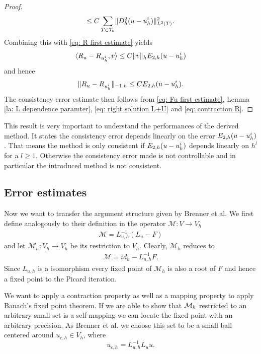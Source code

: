 \begin{proof}
\begin{align}
	\leq C \sum_{T \in \mathcal{T}_h} \lVert D_h^2 (u-u_h^i) \rVert_{L^2(T)}^2.
	\end{align}
	Combining this with \eqref{eq: R first estimate} yields
	\begin{align*}
	 \langle R_u - R_{u^i_h}, v \rangle \leq C \lVert v \rVert_{h} E_{2,h}(u-u_h^i)
	\end{align*}
	and hence 
	\begin{align}
	\lVert R_u - R_{u^i_h} \rVert_{-1,h} \leq C E_{2,h}(u-u_h^i). \label{eq: contraction R}
	\end{align}
	The consistency error estimate then follows from \eqref{eq: Fu first estimate}, Lemma \ref{la: L dependence paramter}, \eqref{eq: right solution L+U} and \eqref{eq: contraction R}.
\end{proof}

This result is very important to understand the performances of the derived method. It states the consistency error depends linearly on the error $E_{2,h}(u-u^i_h)$. That means the method is only consistent if $E_{2,h}(u-u^i_h)$ depends linearly on $h^l$ for a $l \geq 1$. Otherwise the consistency error made is not controllable and in particular the introduced method is not consistent.

\subsection{Error estimates}
Now we want to transfer the argument structure given by Brenner et al. We first define analogously to their definition in \cite[(3.1)]{BGN+2011} the operator $\mathcal M: V \rightarrow V_h$
\begin{align}
	\mathcal M = L_{u,h}^{-1}(L_{u} - F)
\end{align}
and let $\mathcal M_h:V_h \rightarrow V_h$ be its restriction to $V_h$. Clearly, $\mathcal M_h$ reduces to 
\begin{align}
\mathcal M = id_h - L_{u,h}^{-1}F.
\end{align}
Since $L_{u,h}$ is a isomorphism every fixed point of $\mathcal M_h$ is also a root of $F$ and hence a fixed point to the Picard iteration.

We want to apply a contraction property as well as a mapping property to apply Banach's fixed point theorem. If we are able to show that $\mathcal M_h$ restricted to an arbitrary small set is a self-mapping we can locate the fixed point with an arbitrary precision. As Brenner et al. \cite[(3.3)]{BGN+2011} we choose this set to be a small ball centered around $u_{c,h}\in V_h$, where
\[
u_{c,h} = L_{u,h}^{-1} L_u u.
\]

